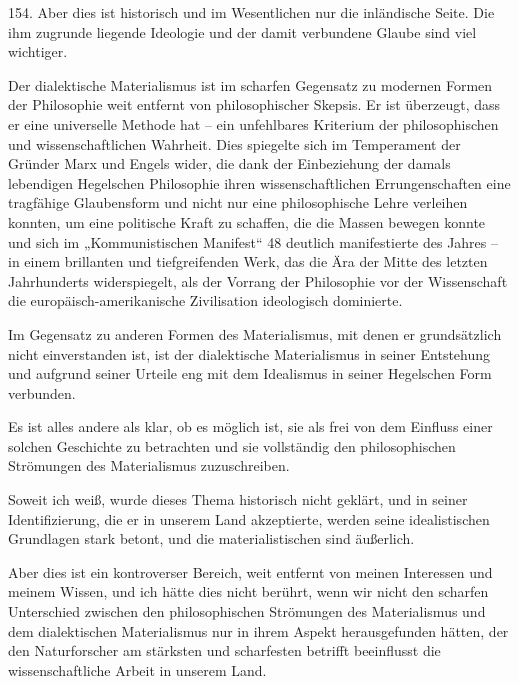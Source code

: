 \documentclass[11pt,a4paper]{book}
\begin{document}
154. Aber dies ist historisch und im Wesentlichen nur die inländische Seite. Die ihm zugrunde liegende Ideologie und der damit verbundene Glaube sind viel wichtiger.



Der dialektische Materialismus ist im scharfen Gegensatz zu modernen Formen der Philosophie weit entfernt von philosophischer Skepsis. Er ist überzeugt, dass er eine universelle Methode hat -- ein unfehlbares Kriterium der philosophischen und wissenschaftlichen Wahrheit. Dies spiegelte sich im Temperament der Gründer Marx und Engels wider, die dank der Einbeziehung der damals lebendigen Hegelschen Philosophie ihren wissenschaftlichen Errungenschaften eine tragfähige Glaubensform und nicht nur eine philosophische Lehre verleihen konnten, um eine politische Kraft zu schaffen, die die Massen bewegen konnte und sich im „Kommunistischen Manifest“ 48 deutlich manifestierte des Jahres -- in einem brillanten und tiefgreifenden Werk, das die Ära der Mitte des letzten Jahrhunderts widerspiegelt, als der Vorrang der Philosophie vor der Wissenschaft die europäisch-amerikanische Zivilisation ideologisch dominierte.



Im Gegensatz zu anderen Formen des Materialismus, mit denen er grundsätzlich nicht einverstanden ist, ist der dialektische Materialismus in seiner Entstehung und aufgrund seiner Urteile eng mit dem Idealismus in seiner Hegelschen Form verbunden.



Es ist alles andere als klar, ob es möglich ist, sie als frei von dem Einfluss einer solchen Geschichte zu betrachten und sie vollständig den philosophischen Strömungen des Materialismus zuzuschreiben.



Soweit ich weiß, wurde dieses Thema historisch nicht geklärt, und in seiner Identifizierung, die er in unserem Land akzeptierte, werden seine idealistischen Grundlagen stark betont, und die materialistischen sind äußerlich.



Aber dies ist ein kontroverser Bereich, weit entfernt von meinen Interessen und meinem Wissen, und ich hätte dies nicht berührt, wenn wir nicht den scharfen Unterschied zwischen den philosophischen Strömungen des Materialismus und dem dialektischen Materialismus nur in ihrem Aspekt herausgefunden hätten, der den Naturforscher am stärksten und scharfesten betrifft beeinflusst die wissenschaftliche Arbeit in unserem Land.
\end{document}
